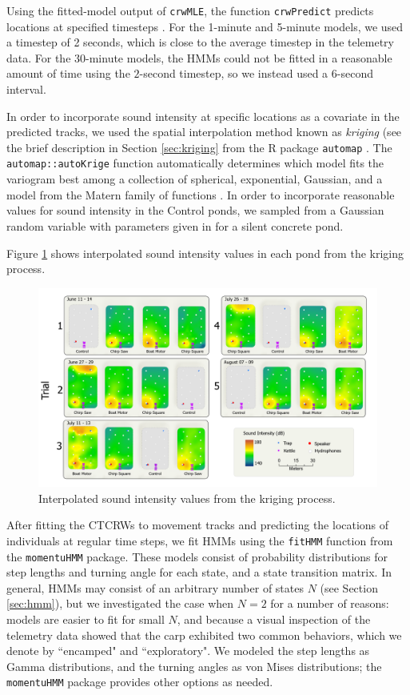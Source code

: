 \documentclass[12pt]{article}
\begin{document}
	Using the fitted-model output of \texttt{crwMLE}, the function \texttt{crwPredict} predicts locations at specified timesteps \cite{crawl, Johnson2008}. For the 1-minute and 5-minute models, we used a timestep of 2 seconds, which is close to the average timestep in the telemetry data. For the 30-minute models, the HMMs could not be fitted in a reasonable amount of time using the $2$-second timestep, so we instead used a 6-second interval.
	
	In order to incorporate sound intensity at specific locations as a covariate in the predicted tracks, we used the spatial interpolation method known as \emph{kriging} (see the brief description in Section \ref{sec:kriging} from the R package \texttt{automap} \cite{Hiemstra2008}. The \texttt{automap::autoKrige} function automatically determines which model fits the variogram best among a collection of spherical, exponential, Gaussian, and a model from the Matern family of functions \cite{Hiemstra2008}. In order to incorporate reasonable values for sound intensity in the Control ponds, we sampled from a Gaussian random variable with parameters given in \cite{Wysocki2007} for a silent concrete pond.
	
	Figure \ref{img:intensities} shows interpolated sound intensity values in each pond from the kriging process.
	
	\begin{figure}[H]
		\includegraphics[width=\textwidth]{intensities.png}
		\caption{Interpolated sound intensity values from the kriging process.}
		\label{img:intensities}
	\end{figure}
	
	After fitting the CTCRWs to movement tracks and predicting the locations of individuals at regular time steps, we fit HMMs using the \texttt{fitHMM} function from the \texttt{momentuHMM} package. These models consist of probability distributions for step lengths and turning angle for each state, and a state transition matrix. In general, HMMs may consist of an arbitrary number of states $N$ (see Section \ref{sec:hmm}), but we investigated the case when $N = 2$ for a number of reasons: models are easier to fit for small $N$, and because a visual inspection of the telemetry data showed that the carp exhibited two common behaviors, which we denote by ``encamped" and ``exploratory". We modeled the step lengths as Gamma distributions, and the turning angles as von Mises distributions; the \texttt{momentuHMM} package provides other options as needed.
	
\end{document}
